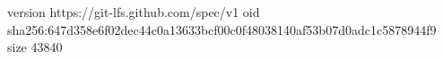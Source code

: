 version https://git-lfs.github.com/spec/v1
oid sha256:647d358e6f02dec44c0a13633bcf00c0f48038140af53b07d0adc1c5878944f9
size 43840
